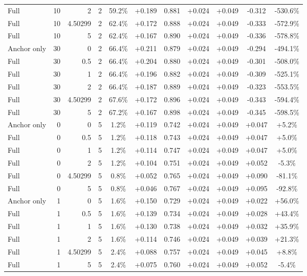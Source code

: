 \begin{table}[htbp]
\begin{tabular}{lrrrccccccc}
Full & 10 & 2 & 2 & 59.2\% & +0.189 & 0.881 & +0.024 & +0.049 & -0.312 & -530.6\% \\
Full & 10 & 4.50299 & 2 & 62.4\% & +0.172 & 0.888 & +0.024 & +0.049 & -0.333 & -572.9\% \\
Full & 10 & 5 & 2 & 62.4\% & +0.167 & 0.890 & +0.024 & +0.049 & -0.336 & -578.8\% \\
Anchor only & 30 & 0 & 2 & 66.4\% & +0.211 & 0.879 & +0.024 & +0.049 & -0.294 & -494.1\% \\
Full & 30 & 0.5 & 2 & 66.4\% & +0.204 & 0.880 & +0.024 & +0.049 & -0.301 & -508.0\% \\
Full & 30 & 1 & 2 & 66.4\% & +0.196 & 0.882 & +0.024 & +0.049 & -0.309 & -525.1\% \\
Full & 30 & 2 & 2 & 66.4\% & +0.187 & 0.889 & +0.024 & +0.049 & -0.323 & -553.5\% \\
Full & 30 & 4.50299 & 2 & 67.6\% & +0.172 & 0.896 & +0.024 & +0.049 & -0.343 & -594.4\% \\
Full & 30 & 5 & 2 & 67.2\% & +0.167 & 0.898 & +0.024 & +0.049 & -0.345 & -598.5\% \\
Anchor only & 0 & 0 & 5 & 1.2\% & +0.119 & 0.742 & +0.024 & +0.049 & +0.047 & +5.2\% \\
Full & 0 & 0.5 & 5 & 1.2\% & +0.118 & 0.743 & +0.024 & +0.049 & +0.047 & +5.0\% \\
Full & 0 & 1 & 5 & 1.2\% & +0.114 & 0.747 & +0.024 & +0.049 & +0.047 & +5.0\% \\
Full & 0 & 2 & 5 & 1.2\% & +0.104 & 0.751 & +0.024 & +0.049 & +0.052 & -5.3\% \\
Full & 0 & 4.50299 & 5 & 0.8\% & +0.052 & 0.765 & +0.024 & +0.049 & +0.090 & -81.1\% \\
Full & 0 & 5 & 5 & 0.8\% & +0.046 & 0.767 & +0.024 & +0.049 & +0.095 & -92.8\% \\
Anchor only & 1 & 0 & 5 & 1.6\% & +0.150 & 0.729 & +0.024 & +0.049 & +0.022 & +56.0\% \\
Full & 1 & 0.5 & 5 & 1.6\% & +0.139 & 0.734 & +0.024 & +0.049 & +0.028 & +43.4\% \\
Full & 1 & 1 & 5 & 1.6\% & +0.130 & 0.738 & +0.024 & +0.049 & +0.032 & +35.9\% \\
Full & 1 & 2 & 5 & 1.6\% & +0.114 & 0.746 & +0.024 & +0.049 & +0.039 & +21.3\% \\
Full & 1 & 4.50299 & 5 & 2.4\% & +0.088 & 0.757 & +0.024 & +0.049 & +0.045 & +8.8\% \\
Full & 1 & 5 & 5 & 2.4\% & +0.075 & 0.760 & +0.024 & +0.049 & +0.052 & -5.4\% \\

\end{tabular}
\end{table}
